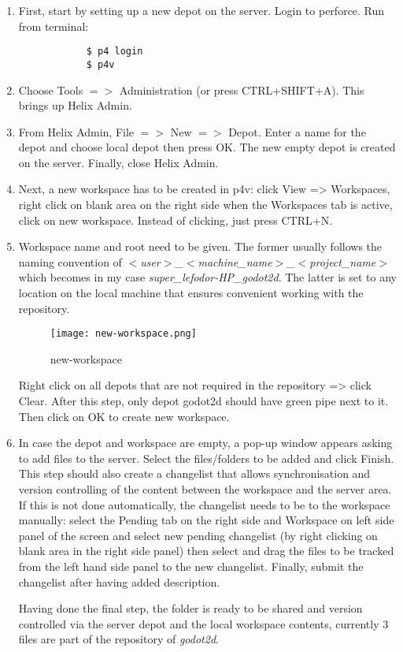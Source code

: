 \begin{enumerate}
    \item First, start by setting up a new depot on the server. Login to perforce. Run from terminal:
        \begin{verbatim}
            $ p4 login
            $ p4v
        \end{verbatim}
    \item Choose Tools {$=>$} Administration (or press CTRL+SHIFT+A). This brings up Helix Admin.
    \item From Helix Admin, File {$=>$} New {$=>$} Depot. Enter a name for the depot and choose local depot then
    press \colorbox{blue!30}{OK}. The new empty depot is created on the server. Finally, close Helix Admin.
    \item Next, a new workspace has to be created in p4v: click View => Workspaces, right click on blank area on the
    right side when the Workspaces tab is active, click on new workspace. Instead of clicking, just press CTRL+N.
    \item Workspace name and root need to be given. The former usually follows the naming convention of 
    \textit{$<$user$>$\_$<$machine\_name$>$\_$<$project\_name$>$} which becomes in my case 
    \textit{super\_lefodor-HP\_godot2d}. The latter is set to any location on the local machine that ensures convenient
    working with the repository.
    \begin{figure}[H]
        \centering
        \texttt{[image: new-workspace.png]}
          \caption{new-workspace}
          \label{fig:new-workspace}
    \end{figure}
    Right click on all depots that are not required in the repository => click Clear. After this step, only depot godot2d
    should have green pipe next to it. Then click on OK to create new workspace.
    \item In case the depot and workspace are empty, a pop-up window appears asking to add files to the server. Select
    the files/folders to be added and click Finish. This step should also create a changelist that allows synchronisation
    and version controlling of the content between the workspace and the server area. If this is not done automatically,
    the changelist needs to be to the workspace manually: select the Pending tab on the right side and Workspace on left
    side panel of the screen and select new pending changelist (by right clicking on blank area in the right side panel)
    then select and drag the files to be tracked from the left hand side panel to the new changelist. Finally, submit the
    changelist after having added description.

    Having done the final step, the folder is ready to be shared and version controlled via the server depot and the 
    local workspace contents, currently 3 files are part of the repository of \textit{godot2d}.
\end{enumerate}
